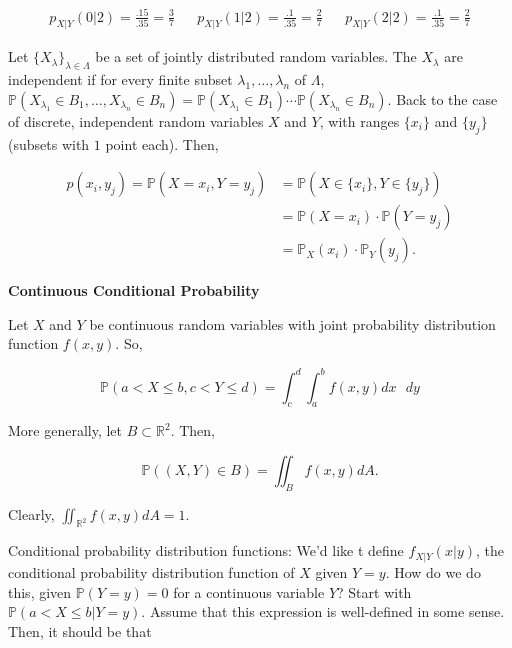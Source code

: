 \documentclass[12pt]{article}
\newcommand{\R}{\mathbb{R}}
\newcommand{\prob}[1]{\mathbb{P}(#1)}
\begin{document}
\begin{align*}
p_{X \lvert Y} (0 \lvert 2) = \frac{.15}{.35} = \frac{3}{7} && p_{X \lvert Y} (1 \lvert 2)  = \frac{.1}{.35} = \frac{2}{7} && p_{X \lvert Y} (2 \lvert 2) = \frac{.1}{.35} = \frac{2}{7}
\end{align*}


\noindent
Let $\{ X_\lambda \}_{\lambda \in \Lambda}$ be a set of jointly distributed random variables. The $X_\lambda$ are independent if for every finite subset $\lambda_1, \ldots, \lambda_n$ of $\Lambda$, $\prob{X_{\lambda_1} \in B_1, \ldots, X_{\lambda_n} \in B_n} = \prob{X_{\lambda_1} \in B_1} \cdots \prob{X_{\lambda_n} \in B_n}$. Back to the case of discrete, independent random variables $X$ and $Y$, with ranges $\{ x_i \}$ and $\{ y_j \}$ (subsets with $1$ point each). Then,

\begin{align*}
p(x_i, y_j) = \prob{X = x_i, Y=y_j} & = \prob{X \in \{ x_i \} , Y \in \{ y_j \}} \\
&= \prob{X = x_i} \cdot \prob{ Y=y_j} \\
&= \mathbb{P}_X(x_i) \cdot  \mathbb{P}_Y(y_j).
\end{align*}

\begin{center}
\textbf{Continuous Conditional Probability}
\end{center}

\noindent
Let $X$ and $Y$ be continuous random variables with joint probability distribution function $f(x,y)$. So,

\begin{equation*}
\prob{a < X \leq b, c < Y \leq d} = \int_{c}^{d} \int_{a}^{b} f(x,y) dx \text{ } dy
\end{equation*}

\noindent
More generally, let $B \subset \R^2$. Then,

\begin{equation*}
\prob{(X, Y) \in B} = \iint_B f(x,y) dA.
\end{equation*}

\noindent
Clearly, $\iint_{\R^2} f(x,y) dA = 1$.


\noindent
Conditional probability distribution functions: We'd like t define $f_{X \lvert Y}(x \lvert y)$, the conditional probability distribution function of $X$ given $Y=y$. How do we do this, given $\prob{Y = y} = 0$ for a continuous variable $Y$? Start with $\prob{a < X \leq b \lvert Y = y }$. Assume that this expression is well-defined in some sense. Then, it should be that
\end{document}
